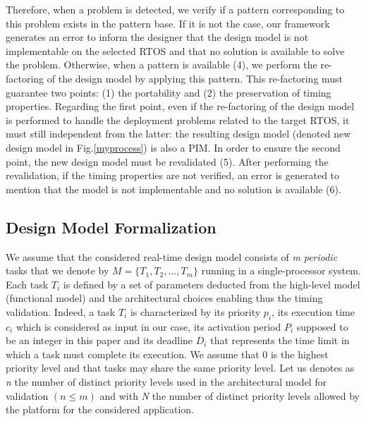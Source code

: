 \documentclass[runningheads,a4paper]{llncs}
\begin{document}
Therefore, when a problem is detected, we verify if a pattern corresponding to this problem exists in the pattern base. If it is not the case, our framework generates an error to inform the designer that the design model is not implementable on the selected RTOS and that no solution is available to solve the problem. 
Otherwise, when a pattern is available (4), we perform the re-factoring of the design model by applying this pattern. This re-factoring must guarantee two points: (1) the portability and (2) the preservation of timing properties. Regarding the first point, even if the re-factoring of the design model is performed to handle the deployment problems related to the target RTOS, it must still independent from the latter: the resulting design model (denoted new design model in Fig.\ref{myprocess}) is also a PIM. In order to ensure the second point, the new design model must be revalidated (5). After performing the revalidation, if the timing properties are not verified, an error is generated to mention that the model is not implementable and no solution is available (6).  

\subsection {Design Model Formalization}
We assume that the considered real-time design model consists of \textit{m} \emph{periodic} tasks that we denote by $M = \{T_1,T_2,\ldots,T_m\}$ running in a single-processor system. Each task $T_i$ is defined by a set of parameters deducted from the high-level model (functional model) and the architectural choices enabling thus the timing validation. Indeed, a task $T_i$ is characterized by its priority $p_i$, its execution time $c_i$  which is considered as input in our case, its activation period $P_i$ supposed to be an integer in this paper and its deadline  $D_i$ that represents the time limit in which a task must complete its execution. We assume that 0 is the highest priority level and that tasks may share the same priority level. Let us denotes as \emph{n} the number of distinct priority levels used in the architectural model for validation $(n \leq m)$ and with  \emph{N}  the number of distinct priority levels allowed by the platform for the considered application. 
\end{document}
